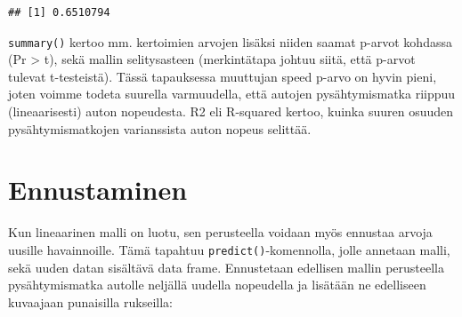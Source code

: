 \documentclass[
]{book}
\newenvironment{Shaded}{\begin{snugshade}}{\end{snugshade}}
\newcommand{\CommentTok}[1]{\textcolor[rgb]{0.56,0.35,0.01}{\textit{#1}}}
\newcommand{\FunctionTok}[1]{\textcolor[rgb]{0.00,0.00,0.00}{#1}}
\newcommand{\NormalTok}[1]{#1}
\newcommand{\OtherTok}[1]{\textcolor[rgb]{0.56,0.35,0.01}{#1}}
\newcommand{\SpecialCharTok}[1]{\textcolor[rgb]{0.00,0.00,0.00}{#1}}
\begin{document}
\begin{Shaded}
\end{Shaded}

\begin{verbatim}
## [1] 0.6510794
\end{verbatim}

\texttt{summary()} kertoo mm. kertoimien arvojen lisäksi niiden saamat p-arvot kohdassa (Pr \textgreater{} \textbar t\textbar), sekä mallin selitysasteen (merkintätapa johtuu siitä, että p-arvot tulevat t-testeistä). Tässä tapauksessa muuttujan speed p-arvo on hyvin pieni, joten voimme todeta suurella varmuudella, että autojen pysähtymismatka riippuu (lineaarisesti) auton nopeudesta. R2 eli R-squared kertoo, kuinka suuren osuuden pysähtymismatkojen varianssista auton nopeus selittää.

\hypertarget{ennustaminen}{%
\section{Ennustaminen}\label{ennustaminen}}

Kun lineaarinen malli on luotu, sen perusteella voidaan myös ennustaa arvoja uusille havainnoille. Tämä tapahtuu \texttt{predict()}-komennolla, jolle annetaan malli, sekä uuden datan sisältävä data frame. Ennustetaan edellisen mallin perusteella pysähtymismatka autolle neljällä uudella nopeudella ja lisätään ne edelliseen kuvaajaan punaisilla rukseilla:
\end{document}
